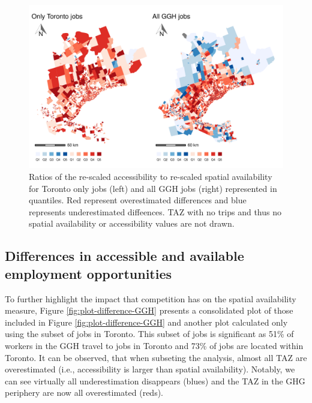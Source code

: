 \documentclass[]{elsarticle} %
\begin{document}
\begin{figure}
\includegraphics[width=1\linewidth]{Spatial-Availability_files/figure-latex/plot-diff-Toronto-vs-GGH-1} \caption{\label{fig:plot-diff-Toronto-vs-GGH}Ratios of the re-scaled accessibility to re-scaled spatial availability for Toronto only jobs (left) and all GGH jobs (right) represented in quantiles. Red represent overestimated differences and blue represents underestimated diffeences. TAZ with no trips and thus no spatial availability or accessibility values are not drawn.}\label{fig:plot-diff-Toronto-vs-GGH}
\end{figure}

\hypertarget{differences-in-accessible-and-available-employment-opportunities}{%
\subsection{Differences in accessible and available employment
opportunities}\label{differences-in-accessible-and-available-employment-opportunities}}

To further highlight the impact that competition has on the spatial
availability measure, Figure \ref{fig:plot-difference-GGH} presents a
consolidated plot of those included in Figure
\ref{fig:plot-difference-GGH} and another plot calculated only using the
subset of jobs in Toronto. This subset of jobs is significant as 51\% of
workers in the GGH travel to jobs in Toronto and 73\% of jobs are
located within Toronto. It can be observed, that when subseting the
analysis, almost all TAZ are overestimated (i.e., accessibility is
larger than spatial availability). Notably, we can see virtually all
underestimation disappears (blues) and the TAZ in the GHG periphery are
now all overestimated (reds).
\end{document}
